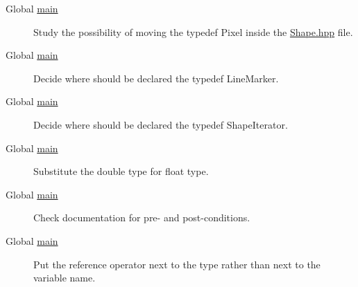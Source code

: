 \label{todo__todo000001}
\hypertarget{todo__todo000001}{}
 \begin{description}
\item[Global \hyperlink{main_8cpp_bf9e6b7e6f15df4b525a2e7705ba3089}{main} ]Study the possibility of moving the typedef Pixel inside the \hyperlink{_shape_8hpp}{Shape.hpp} file. \end{description}


\label{todo__todo000001}
\hypertarget{todo__todo000001}{}
 \begin{description}
\item[Global \hyperlink{main_8cpp_bf9e6b7e6f15df4b525a2e7705ba3089}{main} ]Decide where should be declared the typedef LineMarker. \end{description}


\label{todo__todo000001}
\hypertarget{todo__todo000001}{}
 \begin{description}
\item[Global \hyperlink{main_8cpp_bf9e6b7e6f15df4b525a2e7705ba3089}{main} ]Decide where should be declared the typedef ShapeIterator. \end{description}


\label{todo__todo000001}
\hypertarget{todo__todo000001}{}
 \begin{description}
\item[Global \hyperlink{main_8cpp_bf9e6b7e6f15df4b525a2e7705ba3089}{main} ]Substitute the double type for float type. \end{description}


\label{todo__todo000001}
\hypertarget{todo__todo000001}{}
 \begin{description}
\item[Global \hyperlink{main_8cpp_bf9e6b7e6f15df4b525a2e7705ba3089}{main} ]Check documentation for pre- and post-conditions. \end{description}


\label{todo__todo000001}
\hypertarget{todo__todo000001}{}
 \begin{description}
\item[Global \hyperlink{main_8cpp_bf9e6b7e6f15df4b525a2e7705ba3089}{main} ]Put the reference operator next to the type rather than next to the variable name.

\end{description}

